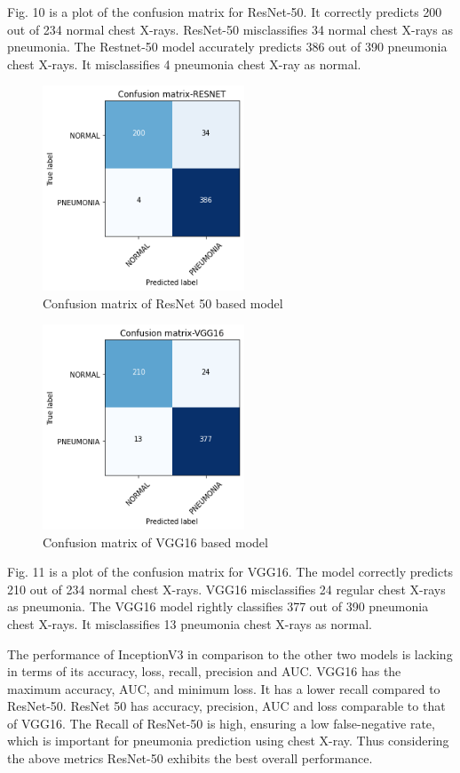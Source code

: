 \documentclass[conference]{IEEEtran}
\begin{document}
Fig. 10 is a plot of the confusion matrix for ResNet-50. It correctly predicts 200 out of  234 normal chest X-rays. ResNet-50 misclassifies  34  normal chest X-rays as pneumonia. The Restnet-50 model accurately predicts 386 out of 390 pneumonia chest X-rays. It  misclassifies  4 pneumonia chest X-ray as normal.

\begin{figure}
\centering
  \vspace{\floatsep}
\includegraphics[width=6cm]{CMRES.png}
\caption{Confusion matrix  of ResNet 50 based model}
\label{fig:cenario}
\end{figure}
\begin{figure}
\centering
 \vspace{\floatsep}
\includegraphics[width=6cm]{CMVGG.png}
\caption{Confusion matrix  of VGG16 based model}
\label{fig:cenario}
\end{figure}

Fig. 11 is a plot of the confusion matrix for VGG16. The model correctly predicts 210 out of  234 normal chest X-rays. VGG16 misclassifies  24 regular chest X-rays as pneumonia. The VGG16 model rightly classifies  377 out of 390 pneumonia chest X-rays. It misclassifies 13 pneumonia chest X-rays as normal.


The performance of InceptionV3 in comparison to the other two models is lacking in terms of its accuracy, loss, recall, precision and AUC. VGG16 has the maximum accuracy, AUC, and minimum loss. It has a lower recall compared to ResNet-50. ResNet 50 has accuracy, precision, AUC and loss comparable to that of VGG16. The Recall of ResNet-50 is high, ensuring a low false-negative rate, which is important for pneumonia prediction using chest X-ray. Thus considering the above metrics ResNet-50 exhibits the best overall performance.
\end{document}

